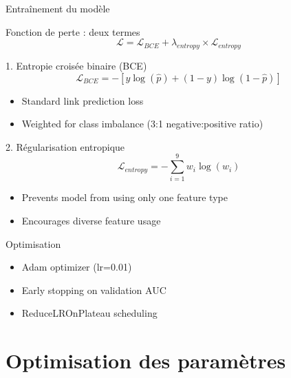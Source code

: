 \documentclass[9pt,aspectratio=169,professionalfonts]{beamer}
\begin{document}
\begin{frame}{Entraînement du modèle}
\begin{block}{Fonction de perte : deux termes}
$$\boxed{\mathcal{L} = \mathcal{L}_{BCE} + \lambda_{entropy} \times \mathcal{L}_{entropy}}$$
\end{block}

\begin{block}{1. Entropie croisée binaire (BCE)}
$$\mathcal{L}_{BCE} = -[y \log(\hat{p}) + (1-y) \log(1-\hat{p})]$$
\begin{itemize}
    \item Standard link prediction loss
    \item Weighted for class imbalance (3:1 negative:positive ratio)
\end{itemize}
\end{block}

\begin{block}{2. Régularisation entropique}
$$\mathcal{L}_{entropy} = -\sum_{i=1}^{9} w_i \log(w_i)$$
\begin{itemize}
    \item Prevents model from using only one feature type
    \item Encourages diverse feature usage
\end{itemize}
\end{block}

\begin{block}{Optimisation}
\begin{itemize}
    \item Adam optimizer (lr=0.01)
    \item Early stopping on validation AUC
    \item ReduceLROnPlateau scheduling
\end{itemize}
\end{block}
\end{frame}

\section{Optimisation des paramètres}
\end{document}
